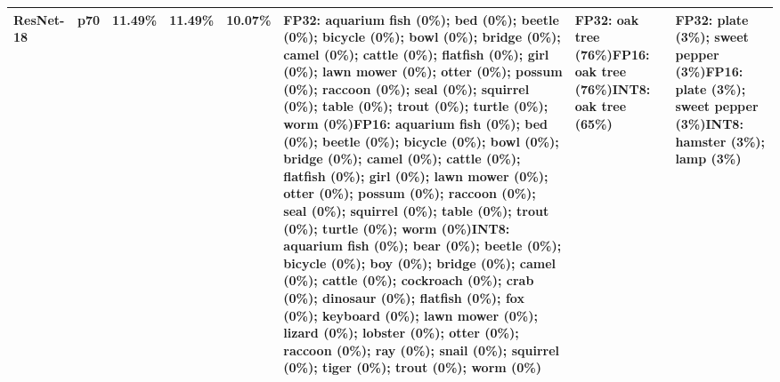 \begin{longtable}{p{2.8cm} r r r r p{5.0cm} p{4.2cm} p{4.2cm}}
ResNet-18 & p70 & 11.49\% & 11.49\% & 10.07\% & FP32: aquarium fish (0\%); bed (0\%); beetle (0\%); bicycle (0\%); bowl (0\%); bridge (0\%); camel (0\%); cattle (0\%); flatfish (0\%); girl (0\%); lawn mower (0\%); otter (0\%); possum (0\%); raccoon (0\%); seal (0\%); squirrel (0\%); table (0\%); trout (0\%); turtle (0\%); worm (0\%)\newline FP16: aquarium fish (0\%); bed (0\%); beetle (0\%); bicycle (0\%); bowl (0\%); bridge (0\%); camel (0\%); cattle (0\%); flatfish (0\%); girl (0\%); lawn mower (0\%); otter (0\%); possum (0\%); raccoon (0\%); seal (0\%); squirrel (0\%); table (0\%); trout (0\%); turtle (0\%); worm (0\%)\newline INT8: aquarium fish (0\%); bear (0\%); beetle (0\%); bicycle (0\%); boy (0\%); bridge (0\%); camel (0\%); cattle (0\%); cockroach (0\%); crab (0\%); dinosaur (0\%); flatfish (0\%); fox (0\%); keyboard (0\%); lawn mower (0\%); lizard (0\%); lobster (0\%); otter (0\%); raccoon (0\%); ray (0\%); snail (0\%); squirrel (0\%); tiger (0\%); trout (0\%); worm (0\%) & FP32: oak tree (76\%)\newline FP16: oak tree (76\%)\newline INT8: oak tree (65\%) & FP32: plate (3\%); sweet pepper (3\%)\newline FP16: plate (3\%); sweet pepper (3\%)\newline INT8: hamster (3\%); lamp (3\%) \\ \hline

\end{longtable}
